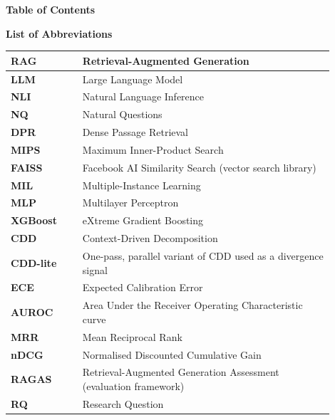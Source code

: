 \documentclass[12pt,a4paper]{article}
\begin{document}
\newpage
\pagestyle{fancy}
\fancyhf{}
\fancyfoot[C]{\small\thepage}
\renewcommand{\headrulewidth}{0.8pt}
\renewcommand{\footrulewidth}{0.8pt}
\setlength{\headheight}{14.5pt}
\setcounter{tocdepth}{1}
{\centering\bfseries\fontsize{14}{17}\selectfont Table of Contents\par}
\vspace{6pt}
{\setlength{\parskip}{0pt}\renewcommand{\contentsname}{}\makeatletter{}\makeatother}
\vspace{14pt}
{\centering\bfseries\fontsize{14}{17}\selectfont List of Abbreviations\par}
\vspace{6pt}
\renewcommand{\arraystretch}{1.25}
\begin{longtable}{|>{\raggedright\arraybackslash\bfseries}p{0.20\linewidth}|>{\raggedright\arraybackslash}p{0.70\linewidth}|}
\hline
RAG & Retrieval-Augmented Generation \\ \hline
LLM & Large Language Model \\ \hline
NLI & Natural Language Inference \\ \hline
NQ & Natural Questions \\ \hline
DPR & Dense Passage Retrieval \\ \hline
MIPS & Maximum Inner-Product Search \\ \hline
FAISS & Facebook AI Similarity Search (vector search library) \\ \hline
MIL & Multiple-Instance Learning \\ \hline
MLP & Multilayer Perceptron \\ \hline
XGBoost & eXtreme Gradient Boosting \\ \hline
CDD & Context-Driven Decomposition \\ \hline
CDD-lite & One-pass, parallel variant of CDD used as a divergence signal \\ \hline
ECE & Expected Calibration Error \\ \hline
AUROC & Area Under the Receiver Operating Characteristic curve \\ \hline
MRR & Mean Reciprocal Rank \\ \hline
nDCG & Normalised Discounted Cumulative Gain \\ \hline
RAGAS & Retrieval-Augmented Generation Assessment (evaluation framework) \\ \hline
RQ & Research Question \\ \hline
\end{longtable}
\newpage
{}
\setcounter{page}{1}
\end{document}
